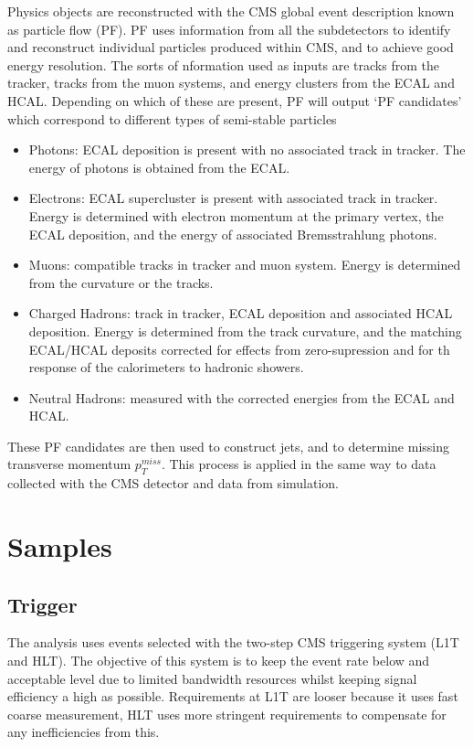Physics objects are reconstructed with the CMS global event description known as particle flow (PF). 
PF uses information from all the subdetectors to identify and reconstruct individual particles produced within CMS, and to achieve good energy resolution.
The sorts of nformation used as inputs are tracks from the tracker, tracks from the muon systems, and energy clusters from the ECAL and HCAL. Depending on which of these are present, PF will output `PF candidates' which correspond to different types of semi-stable particles 
\begin{itemize}[leftmargin=.5in,noitemsep]
    \item Photons: ECAL deposition is present with no associated track in tracker. The energy of photons is obtained from the ECAL. 
    \item Electrons: ECAL supercluster is present with associated track in tracker. Energy is determined with electron momentum at the primary vertex, the ECAL deposition, and the energy of associated Bremsstrahlung photons. 
    \item Muons: compatible tracks in tracker and muon system. Energy is determined from the curvature or the tracks. 
    \item Charged Hadrons: track in tracker, ECAL deposition and associated HCAL deposition. Energy is determined from the track curvature, and the matching ECAL/HCAL deposits corrected for effects from zero-supression and for th response of the calorimeters to hadronic showers.
    \item Neutral Hadrons: measured with the corrected energies from the ECAL and HCAL. 
\end{itemize}
These PF candidates are then used to construct jets, and to determine missing transverse momentum $p_{T}^{miss}$.
This process is applied in the same way to data collected with the CMS detector and data from simulation.


\section{Samples}

\subsection{Trigger}
The analysis uses events selected with the two-step CMS triggering system (L1T and HLT). The objective of this system is to keep the event rate below and acceptable level due to limited bandwidth resources whilst keeping signal efficiency a high as possible. Requirements at L1T are looser because it uses fast coarse measurement, HLT uses more stringent requirements to compensate for any inefficiencies from this. 

